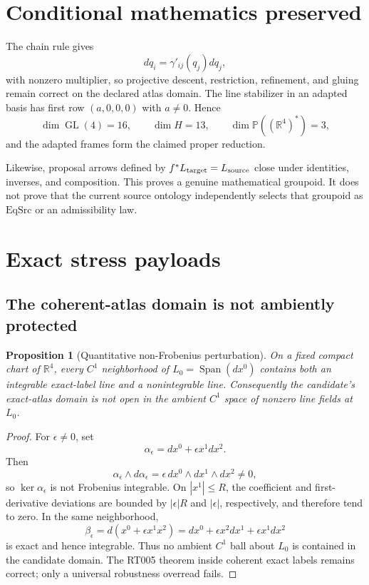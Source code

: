 \documentclass[11pt]{article}
\newtheorem{proposition}{Proposition}
\newcommand{\Span}{\operatorname{Span}}
\newcommand{\GL}{\operatorname{GL}}
\begin{document}
\section{Conditional mathematics preserved}

The chain rule gives
\[
 dq_i=\gamma'_{ij}(q_j)dq_j,
\]
with nonzero multiplier, so projective descent, restriction, refinement, and
gluing remain correct on the declared atlas domain.  The line stabilizer in
an adapted basis has first row $(a,0,0,0)$ with $a\ne0$.  Hence
\[
 \dim\GL(4)=16,\qquad \dim H=13,
 \qquad \dim\mathbb P((\mathbb R^4)^*)=3,
\]
and the adapted frames form the claimed proper reduction.

Likewise, proposal arrows defined by
$f^*L_{\rm target}=L_{\rm source}$ close under identities, inverses, and
composition.  This proves a genuine mathematical groupoid.  It does not prove
that the current source ontology independently selects that groupoid as
$\mathrm{EqSrc}$ or an admissibility law.

\section{Exact stress payloads}

\subsection{The coherent-atlas domain is not ambiently protected}

\begin{proposition}[Quantitative non-Frobenius perturbation]
On a fixed compact chart of $\mathbb R^4$, every $C^1$ neighborhood of
$L_0=\Span(dx^0)$ contains both an integrable exact-label line and a
nonintegrable line.  Consequently the candidate's exact-atlas domain is not
open in the ambient $C^1$ space of nonzero line fields at $L_0$.
\end{proposition}

\begin{proof}
For $\epsilon\ne0$, set
\[
 \alpha_\epsilon=dx^0+\epsilon x^1dx^2.
\]
Then
\[
 \alpha_\epsilon\wedge d\alpha_\epsilon
 =\epsilon\,dx^0\wedge dx^1\wedge dx^2\ne0,
\]
so $\ker\alpha_\epsilon$ is not Frobenius integrable.  On
$|x^1|\le R$, the coefficient and first-derivative deviations are bounded by
$|\epsilon|R$ and $|\epsilon|$, respectively, and therefore tend to zero.
In the same neighborhood,
\[
 \beta_\epsilon=d(x^0+\epsilon x^1x^2)
 =dx^0+\epsilon x^2dx^1+\epsilon x^1dx^2
\]
is exact and hence integrable.  Thus no ambient $C^1$ ball about $L_0$ is
contained in the candidate domain.  The RT005 theorem inside coherent exact
labels remains correct; only a universal robustness overread fails.
\end{proof}
\end{document}
